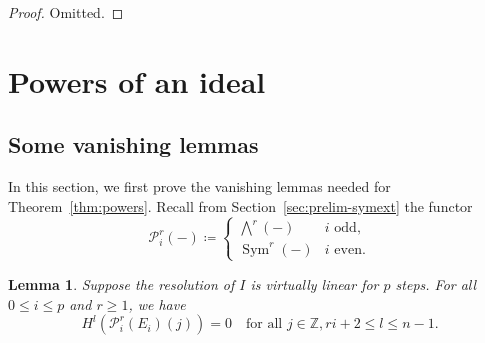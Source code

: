 \documentclass[11pt,letterpaper,reqno]{amsart}
\newcommand{\Sym}{\operatorname{Sym}}
\newcommand{\mc}[1]{\mathcal{#1}}
\newtheorem{lemma}[theorem]{Lemma}
\theoremstyle{definition}
\numberwithin{equation}{section}
\begin{document}
\begin{proof} Omitted.
\end{proof}

\section{Powers of an ideal}

\subsection{Some vanishing lemmas} In this section, we first prove the vanishing lemmas needed for Theorem~\ref{thm:powers}. Recall from Section~\ref{sec:prelim-symext} the functor
\[\mc{P}_i^r(-) \coloneqq \begin{cases}
    \bigwedge^r(-) &i \text{ odd},\\
    \Sym^r(-) &i \text{ even}.
\end{cases}\]
\begin{lemma}\label{lem:vanishing1}
    Suppose the resolution of $I$ is virtually linear for $p$ steps. For all $0 \le i \le p$ and $r \ge 1$, we have
    \[H^l(\mc{P}^r_i(E_i) (j)) = 0 \quad \text{for all }j \in \mathbb{Z}, ri+2 \le l \le n-1.\]
\end{lemma}
\end{document}
